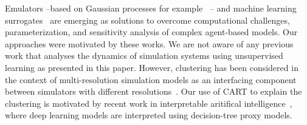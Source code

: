 \documentclass[11pt]{article}
\newcommand{\tuta}{\emph{T.~absoluta}}
\theoremstyle{definition}
\begin{document}

Emulators --based on Gaussian processes for
example~\cite{fadikar2018calibrating} -- and machine learning
surrogates~\cite{lamperti2018agent} are emerging as solutions to overcome
computational challenges, parameterization, and sensitivity analysis of
complex agent-based models. Our approaches were
motivated by these works. We are not aware of any previous
work that analyses the dynamics of simulation systems using unsupervised
learning as presented in this paper. However, clustering has been considered
in the context of multi-resolution simulation models as an interfacing
component between simulators with different
resolutions~\cite{cassandras2000clustering}. Our use of CART to explain the
clustering is motivated by recent work in interpretable aritifical
intelligence~\cite{guidotti2019survey}, where deep learning models are
interpreted using decision-tree proxy models. 
\end{document}
